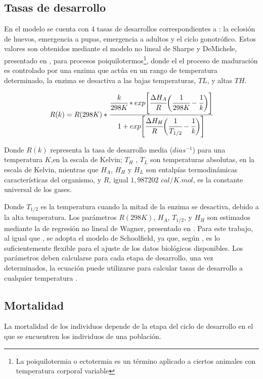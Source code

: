 \subsection{Tasas de desarrollo}
En el modelo se cuenta con 4 tasas de desarrollos correspondientes a : la eclosión de huevos,
emergencia a pupas, emergencia a adultos y el ciclo gonotrófico. Estos valores son obtenidos
mediante el modelo no lineal de Sharpe y DeMichele, presentado en \cite{sharpe1977reaction}, para procesos poiquilotermos\footnote{ La poiquilotermia o ectotermia es un término aplicado a ciertos
animales con temperatura corporal variable}, donde el el proceso de maduración es controlado por
una enzima que actúa en un rango de temperatura determinado, la enzima se desactiva a las bajas temperaturas, $TL$, y altas $TH$.

\begin{equation} \label{eq:schoolfield}
   R(k)  = R(298K) *\cfrac{ \cfrac{k}{298K} *
    exp \Bigg[
            \cfrac{\Delta H_{A}}{R} \bigg(\cfrac{1}{298K} - \cfrac{1}{k}\bigg)
        \Bigg]}
    {1 + exp\Bigg[\cfrac{\Delta H_{H}}{R} \bigg(\cfrac{1}{T_{1/2}}- \cfrac{1}{k}\bigg)\Bigg] }
\end{equation}

Donde $R(k)$ representa la tasa de desarrollo media ($dias^{-1}$) para una temperatura $K$,en la
escala de Kelvin; $T_{H}$ , $T_{L}$ son temperaturas absolutas, en la escala de Kelvin, mientras
que $H_{A}$, $H_{H}$ y $H_{L}$ son entalpías termodinámicas características del organismo, y $R$,
igual $1,987202$ $cal/K.mol$, es la constante universal de los gases.

Donde $T_{1/2}$ es la temperatura cuando la mitad de la enzima se desactiva, debido a la alta
temperatura. Los parámetros $R(298K)$, $H_{A}$, $T_{1/2}$, y $H_{H}$ son estimados mediante la
de regresión no lineal de Wagner, presentado en \cite{wagner1984modeling}. Para este trabajo,
al igual que \cite{rueda1990temperature, otero2006stochastic}, se adopta el modelo de Schoolfield,
ya que, según \cite{otero2006stochastic}, es lo suficientemente flexible para el ajuste de los
datos biológicos disponibles. Los parámetros deben calcularse para cada etapa de desarrollo, una
vez determinados, la ecuación puede utilizarse para calcular tasas de desarrollo a cualquier
temperatura \cite{rueda1990temperature}.

\subsection{Mortalidad}
\label{subsec:cap4-mortalidad}
La mortalidad de los individuos depende de la etapa del ciclo de desarrollo en el que se encuentren
los individuos de una población.



